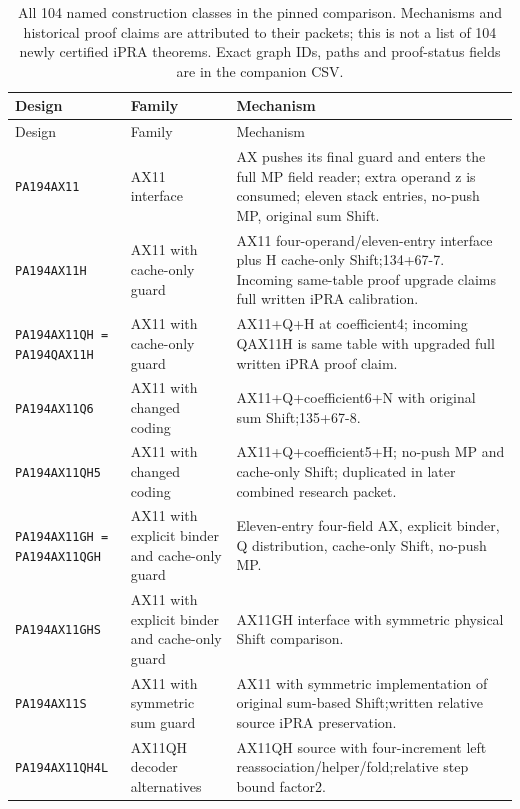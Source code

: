 \begingroup\footnotesize\setlength{\tabcolsep}{4pt}\renewcommand{\arraystretch}{1.18}
\begin{longtable}{@{}>{\raggedright\arraybackslash}p{}>{\raggedright\arraybackslash}p{}>{\raggedright\arraybackslash}p{}@{}}
\caption{All 104 named construction classes in the pinned comparison. Mechanisms and historical proof claims are attributed to their packets; this is not a list of 104 newly certified iPRA theorems. Exact graph IDs, paths and proof-status fields are in the companion CSV.}\label{tab:ledger}\\
\toprule Design & Family & Mechanism\\\midrule\endfirsthead
\toprule Design & Family & Mechanism\\\midrule\endhead
\bottomrule\endfoot
\nolinkurl{PA194AX11} & AX11 interface & AX pushes its final guard and enters the full MP field reader; extra operand z is consumed; eleven stack entries, no-push MP, original sum Shift.\\
\nolinkurl{PA194AX11H} & AX11 with cache-only guard & AX11 four-operand/eleven-entry interface plus H cache-only Shift;134+67-7. Incoming same-table proof upgrade claims full written iPRA calibration.\\
\nolinkurl{PA194AX11QH = PA194QAX11H} & AX11 with cache-only guard & AX11+Q+H at coefficient4; incoming QAX11H is same table with upgraded full written iPRA proof claim.\\
\nolinkurl{PA194AX11Q6} & AX11 with changed coding & AX11+Q+coefficient6+N with original sum Shift;135+67-8.\\
\nolinkurl{PA194AX11QH5} & AX11 with changed coding & AX11+Q+coefficient5+H; no-push MP and cache-only Shift; duplicated in later combined research packet.\\
\nolinkurl{PA194AX11GH = PA194AX11QGH} & AX11 with explicit binder and cache-only guard & Eleven-entry four-field AX, explicit binder, Q distribution, cache-only Shift, no-push MP.\\
\nolinkurl{PA194AX11GHS} & AX11 with explicit binder and cache-only guard & AX11GH interface with symmetric physical Shift comparison.\\
\nolinkurl{PA194AX11S} & AX11 with symmetric sum guard & AX11 with symmetric implementation of original sum-based Shift;written relative source iPRA preservation.\\
\nolinkurl{PA194AX11QH4L} & AX11QH decoder alternatives & AX11QH source with four-increment left reassociation/helper/fold;relative step bound factor2.\\

\end{longtable}

